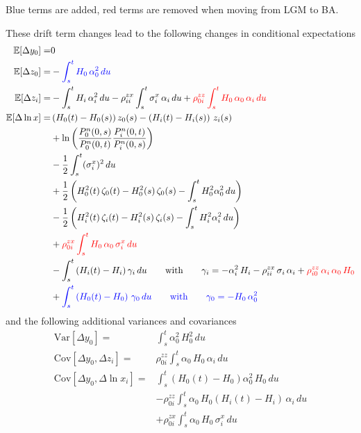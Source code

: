 \documentclass[12pt, a4paper]{article}
\newcommand\E{\ensuremath{\mathbb{E}}}
\begin{document}
{{\begin{appendix}
Blue terms are {\color{blue}added}, red terms are {\color{red}removed} when moving from LGM to BA.

\medskip\noindent

These drift term changes lead to the following changes in conditional expectations 
\begin{align*}
\E[\Delta y_0] =& 0 \\
\E[\Delta z_0] =& - {\color{blue}\int_s^t H_0\,\alpha_0^2\,du}  \\
\E[\Delta z_i] =& - \int_s^t H_i\,\alpha_i^2\,du 
  - \rho^{zx}_{ii}\int_s^t \sigma_i^x\,\alpha_i\,du
  + {\color{red}\rho^{zz}_{0i} \int_s^t H_0\,\alpha_0\,\alpha_i\,du } \\
\E[\Delta \ln x] 
  =& \left(H_0(t)-H_0(s)\right) z_0(s) -\left(H_i(t)-H_i(s)\right)\,z_i(s)\\
  &+ \ln \left( \frac{P^n_0(0,s)}{P^n_0(0,t)} \frac{P^n_i(0,t)}{P^n_i(0,s)}\right) \\
  & - \frac12 \int_s^t (\sigma^x_i)^2\,du \\
  &+\frac12 \left(H^2_0(t)\, \zeta_0(t) -  H^2_0(s) \,\zeta_0(s) - \int_s^t H_0^2 \alpha_0^2\,du\right)\\
  &-\frac12 \left(H^2_i(t) \,\zeta_i(t) -  H^2_i(s) \,\zeta_i(s) - \int_s^t H_i^2 \alpha_i^2\,du\right)\\
  & + {\color{red} \rho^{zx}_{0i} \int_s^t H_0\, \alpha_0\, \sigma^x_i\,du} \\
  &  - \int_s^t \left(H_i(t)-H_i\right)\gamma_i \,du \qquad\mbox{with}\qquad
  \gamma_i = -\alpha_i^2\,H_i -\rho_{ii}^{zx}\,\sigma_i\,\alpha_i + {\color{red}\rho_{i0}^{zz}\,\alpha_i\,\alpha_0\,H_0}   \\
  & + {\color{blue}\int_s^t \left(H_0(t)-H_0\right)\,\gamma_0 \,du \qquad \mbox{with}\qquad \gamma_0 = - H_0\,\alpha_0^2}
\end{align*}
and the following additional variances and covariances
\begin{align*}
\mathrm{Var}[\Delta y_0] =& \int_s^t \alpha_0^2\,H_0^2\,du \\
\mathrm{Cov}[\Delta y_0, \Delta z_i] =& \rho^{zz}_{0i} \int_s^t \alpha_0\,H_0\,\alpha_i\,du \\
\mathrm{Cov}[\Delta y_0, \Delta \ln x_i] =& \int_s^t \left(H_0(t)-H_0\right) \alpha_0^2\,H_0\,du \\
&  - \rho^{zz}_{0i}\int_s^t \alpha_0\,H_0\left(H_i(t)-H_i\right)\, \alpha_i \,du \\
&  +\rho^{zx}_{0i}\int_s^t \alpha_0 \, H_0\,\sigma^x_i \,du 

\end{align*}
\end{appendix}}}
\end{document}
